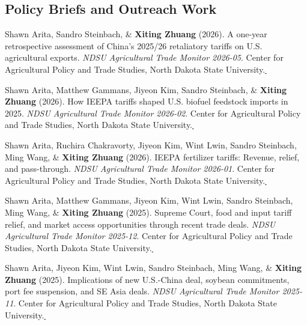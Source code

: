 \documentclass[10.8 pt,letterpaper]{article}
\newcommand{\paperlink}[1]{\href{#1}{\,\small\faExternalLink}}
\renewenvironment{itemize}{
	\begin{list}{}{
			\setlength{\leftmargin}{1.5em}
		}
	}{
	\end{list}
}
\begin{document}
	\subsection*{\textbf{Policy Briefs and Outreach Work}}
	\begin{itemize}
		
		\item[-] Shawn Arita, Sandro Steinbach, \& \textbf{Xiting Zhuang} (2026). A one-year retrospective assessment of China's 2025/26 retaliatory tariffs on U.S. agricultural exports. \textit{NDSU Agricultural Trade Monitor 2026-05}. Center for Agricultural Policy and Trade Studies, North Dakota State University.\paperlink{https://www.capts-ndsu.com/_files/ugd/3c6228_f69f40fb7983449b877db636a4cd1d6a.pdf}

		\item[-] Shawn Arita, Matthew Gammans, Jiyeon Kim, Sandro Steinbach, \& \textbf{Xiting Zhuang} (2026). How IEEPA tariffs shaped U.S. biofuel feedstock imports in 2025. \textit{NDSU Agricultural Trade Monitor 2026-02}. Center for Agricultural Policy and Trade Studies, North Dakota State University.\paperlink{https://www.capts-ndsu.com/_files/ugd/3c6228_885c1fc31a9948d78c74988a7e039cd3.pdf}

		\item[-] Shawn Arita, Ruchira Chakravorty, Jiyeon Kim, Wint Lwin, Sandro Steinbach, Ming Wang, \& \textbf{Xiting Zhuang} (2026). IEEPA fertilizer tariffs: Revenue, relief, and pass-through. \textit{NDSU Agricultural Trade Monitor 2026-01}. Center for Agricultural Policy and Trade Studies, North Dakota State University.\paperlink{https://www.capts-ndsu.com/_files/ugd/3c6228_df79f1f42b5f4d98a0428a2c43085b98.pdf}
		
		\item[-] Shawn Arita, Matthew Gammans, Jiyeon Kim, Wint Lwin, Sandro Steinbach, Ming Wang, \& \textbf{Xiting Zhuang} (2025). Supreme Court, food and input tariff relief, and market access opportunities through recent trade deals. \textit{NDSU Agricultural Trade Monitor 2025-12}. Center for Agricultural Policy and Trade Studies, North Dakota State University.\paperlink{https://www.capts-ndsu.com/_files/ugd/3c6228_c0952c30cd4848a7b76fead0aed0853e.pdf}
		
		\item[-] Shawn Arita, Jiyeon Kim, Wint Lwin, Sandro Steinbach, Ming Wang, \& \textbf{Xiting Zhuang} (2025). Implications of new U.S.-China deal, soybean commitments, port fee suspension, and SE Asia deals. \textit{NDSU Agricultural Trade Monitor 2025-11}. Center for Agricultural Policy and Trade Studies, North Dakota State University.\paperlink{https://www.capts-ndsu.com/_files/ugd/3c6228_26d85e314b884039ac6aa9f2d9b3b739.pdf}
		

\end{itemize}
\end{document}
